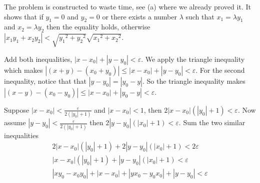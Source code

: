 \begin{problem}
{	\item The problem is constructed to waste time, see (a) where we already proved it. It shows that if $y_1=0$ and $y_2=0$ or there exists a number $\lambda$ such that $x_1=\lambda y_1$ and $x_2=\lambda y_2$ then the equality holds, otherwise $|x_1y_1+x_2y_2| < \sqrt{{y_1}^2+{y_2}^2}\sqrt{{x_1}^2+{x_2}^2}$.
	}

	
\end{problem}

\begin{problem}
	Add both inequalities, $|x-x_0|+|y-y_0| < \varepsilon$. We apply the triangle inequality which makes $|(x+y)-(x_0+y_0)|\leq |x-x_0|+|y-y_0|<\varepsilon$. For the second inequality, notice that that  $|y-y_0|=|y_0-y|$. So the triangle inequality makes $|(x-y)-(x_0-y_0)|\leq |x-x_0|+|y_0-y| < \varepsilon$.
\end{problem}

\begin{hproblem}
	Suppose $|x-x_0|< \frac{\varepsilon}{2(|y_0|+1)}$ and $|x-x_0| < 1$, then $2|x-x_0|(|y_0|+1) < \varepsilon$. Now assume $|y-y_0|< \frac{\varepsilon}{2(|y_0|+1)}$ then $2|y-y_0|(|x_0|+1) < \varepsilon$. Sum the two similar inequalities \\
	\begin{align*}
		2|x-x_0|(|y_0|+1)+2|y-y_0|(|x_0|+1) < 2\varepsilon \\
		|x-x_0|(|y_0|+1)+|y-y_0|(|x_0|+1) < \varepsilon \\
		|xy_0-x_0y_0|+|x-x_0|+|yx_0-y_0x_0|+|y-y_0| < \varepsilon
	\end{align*}
\end{hproblem}